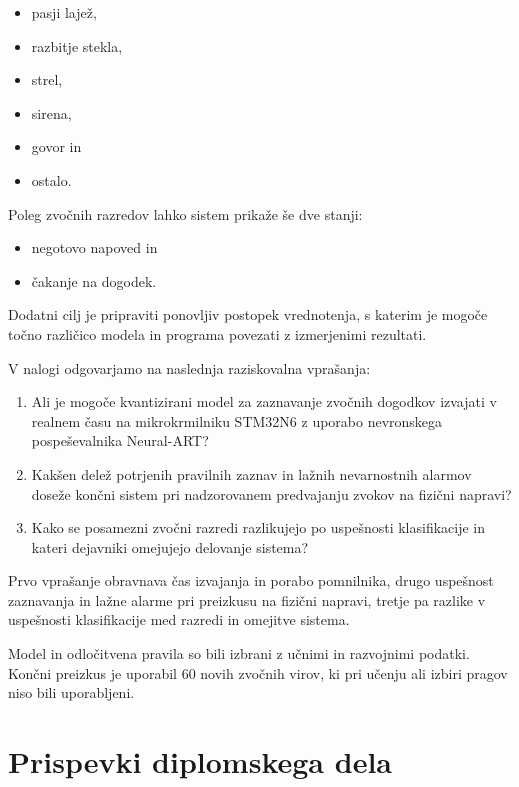 \begin{itemize}
\item pasji lajež,
\item razbitje stekla,
\item strel,
\item sirena,
\item govor in
\item ostalo.
\end{itemize}

Poleg zvočnih razredov lahko sistem prikaže še dve stanji:

\begin{itemize}
\item negotovo napoved in
\item čakanje na dogodek.
\end{itemize}

Dodatni cilj je pripraviti ponovljiv postopek vrednotenja, s katerim je mogoče
točno različico modela in programa povezati z izmerjenimi rezultati.

V nalogi odgovarjamo na naslednja raziskovalna vprašanja:

\begin{enumerate}
  \item Ali je mogoče kvantizirani model za zaznavanje zvočnih dogodkov
        izvajati v realnem času na mikrokrmilniku STM32N6 z uporabo
        nevronskega pospeševalnika Neural-ART?
  \item Kakšen delež potrjenih pravilnih zaznav in lažnih nevarnostnih alarmov
        doseže končni sistem pri nadzorovanem predvajanju zvokov na fizični
        napravi?
  \item Kako se posamezni zvočni razredi razlikujejo po uspešnosti klasifikacije in kateri
        dejavniki omejujejo delovanje sistema?
\end{enumerate}

Prvo vprašanje obravnava čas izvajanja in porabo pomnilnika, drugo uspešnost
zaznavanja in lažne alarme pri preizkusu na fizični napravi, tretje pa razlike
v uspešnosti klasifikacije med razredi in omejitve sistema.

Model in odločitvena pravila so bili izbrani z učnimi in razvojnimi podatki.
Končni preizkus je uporabil 60 novih zvočnih virov, ki pri učenju ali izbiri
pragov niso bili uporabljeni.

\section{Prispevki diplomskega dela}

